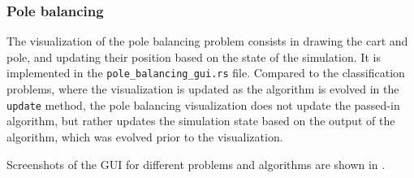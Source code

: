 \subsubsection{Pole balancing}

The visualization of the pole balancing problem consists in drawing the cart and pole, and updating their position based on the state of the simulation.
It is implemented in the \texttt{pole\_balancing\_gui.rs} file. Compared to the classification problems, where the visualization is updated as the algorithm is evolved in the \texttt{update} method,
the pole balancing visualization does not update the passed-in algorithm, but rather updates the simulation state based on the output of the algorithm, which was evolved prior to the visualization.

Screenshots of the GUI for different problems and algorithms are shown in .

